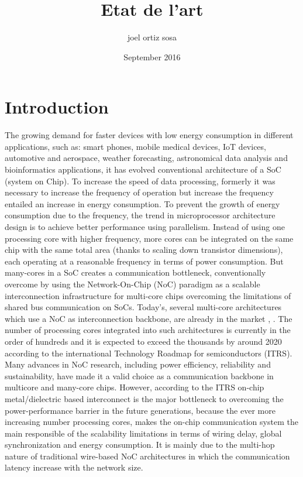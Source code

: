 \documentclass[12pt]{article}
\title{Etat de l'art}
\author{joel ortiz sosa }
\date{September 2016}
\begin{document}
\maketitle

\section{Introduction}
The growing demand for faster devices with low energy consumption in different applications, such as: smart phones, mobile medical devices, IoT devices, automotive and aerospace, weather forecasting, astronomical data analysis and bioinformatics applications, it has evolved conventional architecture of a SoC (system on Chip). To increase the speed of data processing, formerly it was necessary to increase the frequency of operation but increase the frequency entailed an increase in energy consumption. To prevent the growth of energy consumption due to the frequency, the trend in microprocessor architecture design is to achieve better performance using parallelism\citep{2006}. Instead of using one processing core with higher frequency, more cores can be integrated on the same chip with the same total area (thanks to scaling down transistor dimensions), each operating at a reasonable frequency in terms of power consumption. 
But many-cores in a SoC creates a communication bottleneck, conventionally overcome by using the Network-On-Chip (NoC) paradigm as a scalable interconnection infrastructure for multi-core chips \citep{976921} overcoming the limitations of shared bus communication on SoCs. Today’s, several multi-core architectures which use a NoC as interconnection backbone, are already in the market \citep{2709201601}, \citep{2709201602}. The number of processing cores integrated into such architectures is currently in the order of hundreds and it is expected to exceed the thousands by around 2020 according to the international Technology Roadmap for semiconductors (ITRS).
Many advances in NoC research, including power efficiency, reliability and sustainability, have made it a valid choice as a communication backbone in multicore and many-core chips. However, according to the ITRS on-chip metal/dielectric based interconnect is the major bottleneck to overcoming the power-performance barrier in the future generations, because the ever more increasing number processing cores, makes the on-chip communication system the main responsible of the scalability limitations in terms of wiring delay, global synchronization and energy consumption. It is mainly due to the multi-hop nature of traditional wire-based NoC architectures in which the communication latency increase with the network size.
\end{document}
